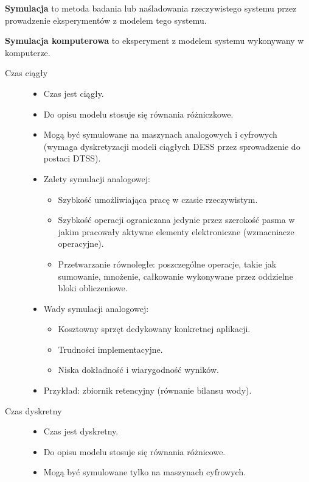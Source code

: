 \textbf{Symulacja} to metoda badania lub naśladowania rzeczywistego systemu przez prowadzenie eksperymentów z modelem tego systemu. 

\textbf{Symulacja komputerowa} to eksperyment z modelem systemu wykonywany w komputerze.

\begin{description}
    \item[Czas ciągły]\mbox{}
    \begin{itemize}
        \item Czas jest ciągły.
        \item Do opisu modelu stosuje się równania różniczkowe.
        \item Mogą być symulowane na maszynach analogowych i cyfrowych (wymaga dyskretyzacji modeli ciągłych DESS przez sprowadzenie do postaci DTSS).
        \item Zalety symulacji analogowej:\mbox{}
        \begin{itemize}
            \item Szybkość umożliwiająca pracę w czasie rzeczywistym.
            \item Szybkość operacji ograniczana jedynie przez szerokość pasma w jakim pracowały aktywne elementy elektroniczne (wzmacniacze operacyjne).
            \item Przetwarzanie równoległe: poszczególne operacje, takie jak sumowanie, mnożenie, całkowanie wykonywane przez oddzielne bloki obliczeniowe.
        \end{itemize}
        \item Wady symulacji analogowej:\mbox{}
        \begin{itemize}
            \item Kosztowny sprzęt dedykowany konkretnej aplikacji.
            \item Trudności implementacyjne.
            \item Niska dokładność i wiarygodność wyników.
        \end{itemize}
        \item Przykład: zbiornik retencyjny (równanie bilansu wody).
    \end{itemize}
    \item[Czas dyskretny]\mbox{}
    \begin{itemize}
        \item Czas jest dyskretny.
        \item Do opisu modelu stosuje się równania różnicowe.
        \item Mogą być symulowane tylko na maszynach cyfrowych.

\end{itemize}
\end{description}
